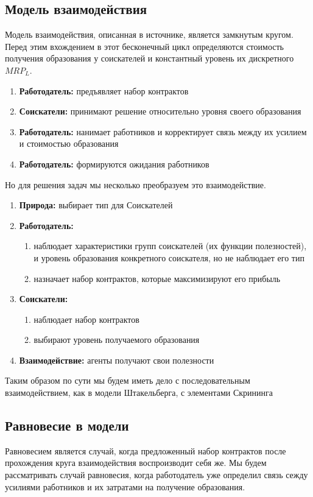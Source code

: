 \subsection{Модель взаимодействия}
\indent\setlength{\parindent}{1em}Модель взаимодействия, описанная в источнике, является замкнутым кругом. Перед этим вхождением в этот бесконечный цикл определяются стоимость получения образования у соискателей и константный уровень их дискретного $MRP_L$.
\begin{enumerate}
    \item \textbf{Работодатель:} предъявляет набор контрактов
    \item \textbf{Соискатели:} принимают решение относительно уровня своего образования
    \item \textbf{Работодатель:} нанимает работников и корректирует связь между их усилием и стоимостью образования
    \item \textbf{Работодатель:} формируются ожидания работников
\end{enumerate}
\indent\setlength{\parindent}{1em}Но для решения задач мы несколько преобразуем это взаимодействие.
\begin{enumerate}
    \item \textbf{Природа:} выбирает тип для Соискателей
    \item \textbf{Работодатель:} \begin{enumerate}
        \item наблюдает характеристики групп соискателей (их функции полезностей), и уровень образования конкретного соискателя, но не наблюдает его тип
        \item назначает набор контрактов, которые максимизируют его прибыль
    \end{enumerate}
    \item \textbf{Соискатели:} \begin{enumerate}
        \item наблюдает набор контрактов
        \item выбирают уровень получаемого образования
    \end{enumerate}
    \item \textbf{Взаимодействие:} агенты получают свои полезности
\end{enumerate}
\indent\setlength{\parindent}{1em}Таким образом по сути мы будем иметь дело с последовательным взаимодействием, как в модели Штакельберга, с элементами Скрининга
\subsection{Равновесие в модели}
\indent\setlength{\parindent}{1em}Равновесием является случай, когда предложенный набор контрактов после прохождения круга взаимодействия воспроизводит себя же. Мы будем рассматривать случай равновесия, когда работодатель уже определил связь сежду усилиями работников и их затратами на получение образования.

